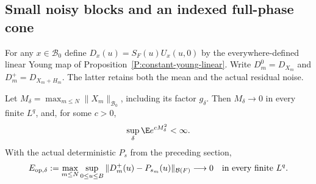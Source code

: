 \subsection{Small noisy blocks and an indexed full-phase cone}

For any $x\in\mathscr B_0$ define
$D_x(u)=S_F(u)U_x(u,0)$ by the everywhere-defined linear Young
map of Proposition~\ref{P:constant-young-linear}.
Write $D_m^0=D_{X_m}$ and $D_m^+=D_{X_m+H_m}$.
The latter retains both the mean and the actual residual noise.

\begin{lemma}
  \label{L:raw-block-uniform-error}
  Let $M_\delta=\max_{m\le N}\|X_m\|_{\mathscr B_0}$, including
  its factor $g_\delta$. Then $M_\delta\to0$ in every finite $L^q$,
  and, for some $c>0$,
  \begin{equation}\label{E:raw-block-maximum-exponential}
    \sup_\delta\E e^{cM_\delta^2}<\infty.
  \end{equation}
  With the actual deterministic $P_s$ from the preceding section,
  \begin{equation}\label{E:raw-block-operator-error}
    E_{\mathrm{op},\delta}:=
    \max_{m\le N}\sup_{0\le u\le B}
    \|D_m^+(u)-P_{s_m}(u)\|_{\mathcal B(F)}
    \longrightarrow0
    \quad\hbox{in every finite }L^q.
  \end{equation}
\end{lemma}

